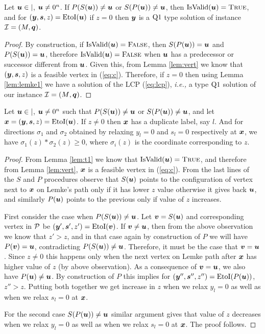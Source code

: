 \begin{lemma}\label{lem:t1}
Let $\uu \in \vert$, $\uu \neq 0^n$. %
If $P(S(\uu))\neq \uu$ or $S(P(\uu))\neq \uu$, then $\isvalid(\uu)=\True$, and for $(\yy,\ps,z)=\eti(\uu)$ if $z=0$ then $\yy$ is a $\PLo$ type solution of \PLCP instance $\CI=(M,\qq)$. 
\end{lemma}
\begin{proof}
By construction, if $\isvalid(\uu) = \False$, then $S(P(\uu))=\uu$ and $P(S(\uu))=\uu$, therefore $\isvalid(\uu)=\False$ when $\uu$ has a predecessor or successor different from $\uu$.
Given this, from Lemma \ref{lem:vert} we know that $(\yy,\ps,z)$ is a feasible vertex in (\ref{eq:c}). Therefore, if $z=0$ then using Lemma \ref{lem:lemke1} we have a solution of the LCP (\ref{eq:lcp}), {\em i.e.,} a type $\PLo$ solution of our \PLCP instance $\CI=(\MM,\qq)$.
\end{proof}

\begin{lemma}\label{lem:t2}
Let $\uu \in \vert$, $\uu \neq 0^n$ such that $P(S(\uu))\neq \uu$ or $S(P(\uu))\neq \uu$, and let $\xx=(\yy,\ps,z)=\eti(\uu)$. 
If $z\neq 0$ then $\xx$ has a duplicate label, say $l$. And for directions $\sigma_1$ and $\sigma_2$ obtained by relaxing $y_l=0$ and $s_l=0$ respectively at $\xx$, we have $\sigma_1(z)*\sigma_2(z)\ge 0$, where $\sigma_i(z)$ is the coordinate corresponding to $z$. 
\end{lemma}
\begin{proof}
From Lemma \ref{lem:t1} we know that $\isvalid(\uu)=\True$, and therefore from Lemma \ref{lem:vert}, $\xx$ is a feasible vertex in (\ref{eq:c}).
From the last lines of the $S$ and $P$ procedures observe that $S(\uu)$ points to the configuration of vertex next to $\xx$ on Lemke's path only if it has lower $z$ value otherwise it gives back $\uu$, and similarly $P(\uu)$ points to the previous only if value of $z$ increases.

First consider the case when $P(S(\uu))\neq \uu$. Let $\vv=S(\uu)$ and corresponding vertex in $\CPol$ be $(\yy',\ps',z')=\eti(\vv)$. 
If $\vv\neq \uu$, then from the above observation we know that $z'>z$, and in that
case again by construction of $P$ we will have $P(\vv)=\uu$, contradicting
$P(S(\uu))\neq \uu$. Therefore, it must be the case that $\vv=\uu$.
Since $z\neq 0$ this happens only when the next vertex on Lemke path after $\xx$ has
higher value of $z$ (by above observation). As a consequence of $\vv=\uu$, we also have $P(\uu)\neq \uu$. By construction of $P$ this implies for 
$(\yy'',\ps'',z'')=\eti(P(\uu))$, $z''>z$. Putting both together we get 
increase in $z$ when we relax $y_l=0$ as well as when we relax $s_l=0$ at
$\xx$.

For the second case $S(P(\uu))\neq \uu$ similar argument gives that value of $z$ decreases when we relax $y_l=0$ as well as when we relax $s_l=0$ at
$\xx$. The proof follows.
\end{proof}

